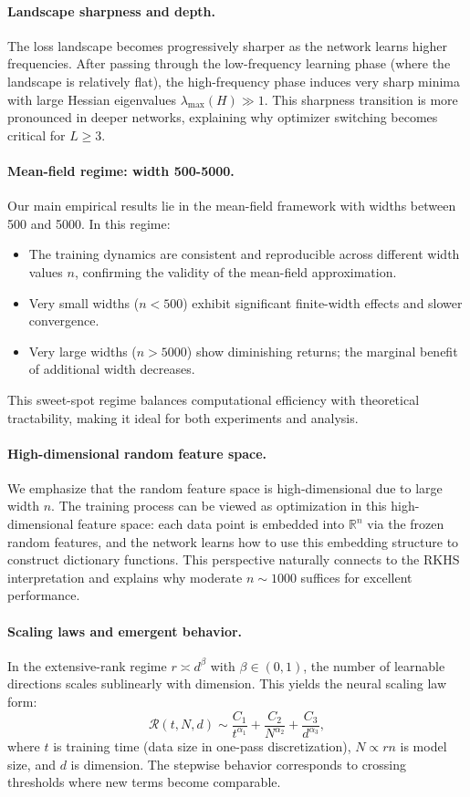 \documentclass{article}
\begin{document}
\paragraph{Landscape sharpness and depth.}
The loss landscape becomes progressively sharper as the network learns higher frequencies. After passing through the low-frequency learning phase (where the landscape is relatively flat), the high-frequency phase induces very sharp minima with large Hessian eigenvalues \( \lambda_{\max}(H) \gg 1 \). This sharpness transition is more pronounced in deeper networks, explaining why optimizer switching becomes critical for \( L \geq 3 \).

\paragraph{Mean-field regime: width 500-5000.}
Our main empirical results lie in the mean-field framework with widths between 500 and 5000. In this regime:
\begin{itemize}
    \item The training dynamics are consistent and reproducible across different width values \( n \), confirming the validity of the mean-field approximation.
    \item Very small widths (\( n < 500 \)) exhibit significant finite-width effects and slower convergence.
    \item Very large widths (\( n > 5000 \)) show diminishing returns; the marginal benefit of additional width decreases.
\end{itemize}
This sweet-spot regime balances computational efficiency with theoretical tractability, making it ideal for both experiments and analysis.

\paragraph{High-dimensional random feature space.}
We emphasize that the random feature space is high-dimensional due to large width \( n \). The training process can be viewed as optimization in this high-dimensional feature space: each data point is embedded into \( \mathbb{R}^n \) via the frozen random features, and the network learns how to use this embedding structure to construct dictionary functions. This perspective naturally connects to the RKHS interpretation and explains why moderate \( n \sim 1000 \) suffices for excellent performance.

\paragraph{Scaling laws and emergent behavior.}
In the extensive-rank regime \( r \asymp d^\beta \) with \( \beta \in (0,1) \), the number of learnable directions scales sublinearly with dimension. This yields the neural scaling law form:
\[
\mathcal{R}(t, N, d) \sim \frac{C_1}{t^{\alpha_1}} + \frac{C_2}{N^{\alpha_2}} + \frac{C_3}{d^{\alpha_3}},
\]
where \( t \) is training time (data size in one-pass discretization), \( N \propto rn \) is model size, and \( d \) is dimension. The stepwise behavior corresponds to crossing thresholds where new terms become comparable.
\end{document}
